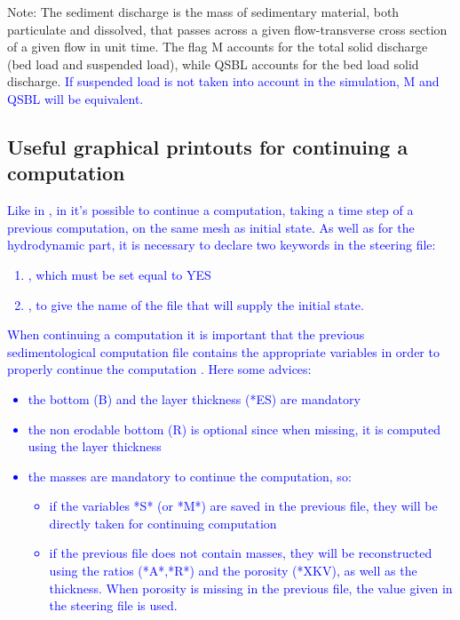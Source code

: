 \begin{WarningBlock}{Note:}
The sediment discharge is the mass of sedimentary material, both particulate and dissolved, that passes across a given flow-transverse cross section of a given flow in unit time. The flag {\ttfamily M} accounts for the total solid discharge (bed load and suspended load), while {\ttfamily QSBL} accounts for the bed load solid discharge. \textcolor{blue}{If suspended load is not taken into account in the simulation, {\ttfamily M} and {\ttfamily QSBL} will be equivalent.}
\end{WarningBlock}
\subsection{Useful graphical printouts for continuing a computation}
\textcolor{blue}{Like in , in \gaia{} it's possible to continue a computation, taking a time step of a previous computation, on the same mesh as initial state.
As well as for the hydrodynamic part, it is necessary to declare two keywords in the steering file:
\begin{enumerate}
\item {}, which must be set equal to YES
\item {}, to give the name of the file that will supply the initial state.
\end{enumerate}
When continuing a computation it is important that the previous sedimentological computation file contains the appropriate variables in order to properly continue the computation .
Here some advices:
\begin{itemize}
\item the bottom (B) and the layer thickness (*ES) are mandatory
\item the non erodable bottom (R) is optional since when missing, it is computed using the layer thickness
\item the masses are mandatory to continue the computation, so:
\begin{itemize}
 \item if the variables *S* (or *M*) are saved in the previous file, they will be directly taken for continuing computation
 \item if the previous file does not contain masses, they will be reconstructed using the ratios (*A*,*R*) and the porosity (*XKV), as well as the thickness. When porosity is missing in the
previous file, the value given in the steering file is used.
\end{itemize}
\end{itemize}   }
